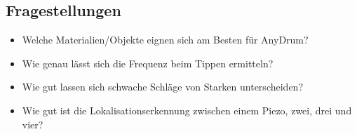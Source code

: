 \subsection*{Fragestellungen}
\begin{itemize}
	\item Welche Materialien/Objekte eignen sich am Besten für AnyDrum?
	\item Wie genau lässt sich die Frequenz beim Tippen ermitteln?
	\item Wie gut lassen sich schwache Schläge von Starken unterscheiden?
	\item Wie gut ist die Lokalisationserkennung zwischen einem Piezo, zwei, drei und vier?
\end{itemize}